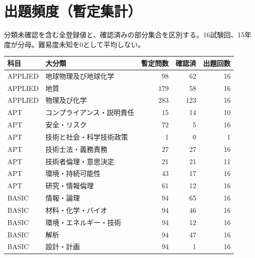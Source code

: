 \chapter{出題頻度（暫定集計）}
分類未確認を含む全登録値と、確認済みの部分集合を区別する。16試験回、15年度が分母。難易度未知を0として平均しない。
\begin{longtable}{p{.16\linewidth}p{.42\linewidth}rrr}
科目 & 大分類 & 暫定問数 & 確認済 & 出題回数\\\hline
APPLIED & 地球物理及び地球化学 & 98 & 62 & 16\\
APPLIED & 地質 & 179 & 58 & 16\\
APPLIED & 物理及び化学 & 283 & 123 & 16\\
APT & コンプライアンス・説明責任 & 15 & 14 & 10\\
APT & 安全・リスク & 72 & 5 & 16\\
APT & 技術と社会・科学技術政策 & 1 & 0 & 1\\
APT & 技術士法・義務責務 & 27 & 27 & 16\\
APT & 技術者倫理・意思決定 & 21 & 21 & 11\\
APT & 環境・持続可能性 & 43 & 17 & 16\\
APT & 研究・情報倫理 & 61 & 12 & 16\\
BASIC & 情報・論理 & 94 & 65 & 16\\
BASIC & 材料・化学・バイオ & 94 & 46 & 16\\
BASIC & 環境・エネルギー・技術 & 94 & 12 & 16\\
BASIC & 解析 & 94 & 47 & 16\\
BASIC & 設計・計画 & 94 & 1 & 16\\
\end{longtable}
